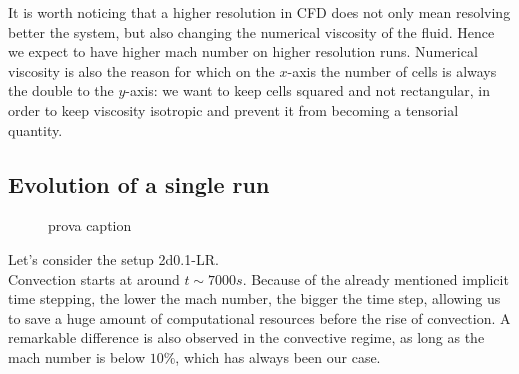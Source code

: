 It is worth noticing that a higher resolution in CFD does not only mean resolving better the system, but also changing the numerical viscosity of the fluid. Hence we expect to have higher mach number on higher resolution runs.
Numerical viscosity is also the reason for which on the $x$-axis the number of cells is always the double to the $y$-axis: we want to keep cells squared and not rectangular, in order to keep viscosity isotropic and prevent it from becoming a tensorial quantity. \\

\subsection{Evolution of a single run}
\begin{figure}[t]
  \centering
      \hfill
	  \label{2d001-LRps2}
	\caption{prova caption}
  \end{figure}
Let's consider the setup 2d0.1-LR. \\
Convection starts at around $t \sim 7000 s$. Because of the already mentioned implicit time stepping, the lower the mach number, the bigger the time step, allowing us to save a huge amount of computational resources before the rise of convection. A remarkable difference is also observed in the convective regime, as long as the mach number is below $10 \%$, which has always been our case. \\
